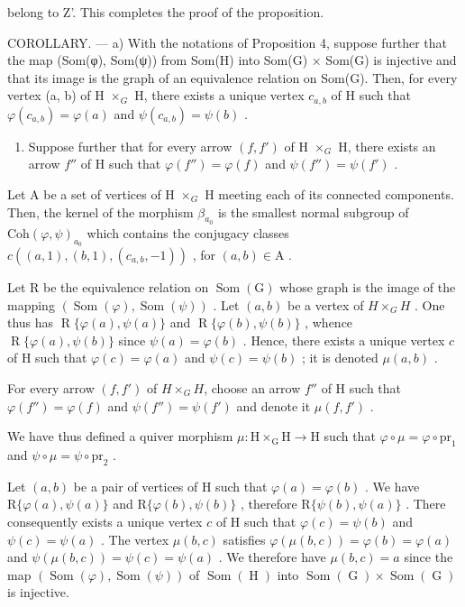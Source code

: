 belong to Z'. This completes the proof of the proposition.

COROLLARY. --- a) With the notations of Proposition 4, suppose further that the map (Som(φ), Som(ψ)) from Som(H) into Som(G) × Som(G) is injective and that its image is the graph of an equivalence relation on Som(G). Then, for every vertex (a, b) of H \(\times_{G}\) H, there exists a unique vertex \(c_{a,b}\) of H such that \(\varphi(c_{a,b}) = \varphi(a)\) and \(\psi(c_{a,b}) = \psi(b)\) .

\begin{enumerate}
\def\labelenumi{\alph{enumi})}
\setcounter{enumi}{1}
\tightlist
\item
  Suppose further that for every arrow \((f, f')\) of H \(\times_{G}\) H, there exists an arrow \(f''\) of H such that \(\varphi(f'') = \varphi(f)\) and \(\psi(f'') = \psi(f')\) .
\end{enumerate}

Let A be a set of vertices of H \(\times_{G}\) H meeting each of its connected components. Then, the kernel of the morphism \(\beta_{a_{0}}\) is the smallest normal subgroup of \(\mathrm{Coh}(\varphi,\psi)_{a_{0}}\) which contains the conjugacy classes \(c((a,1),(b,1),(c_{a,b},-1))\) , for \((a,b)\in\mathrm{A}\) .

Let R be the equivalence relation on \(\operatorname{Som}(\mathrm{G})\) whose graph is the image of the mapping \((\operatorname{Som}(\varphi),\operatorname{Som}(\psi))\) . Let \((a,b)\) be a vertex of \(H\times_{G}H\) . One thus has \(\operatorname{R}\{\varphi(a),\psi(a)\}\) and \(\operatorname{R}\{\varphi(b),\psi(b)\}\) , whence \(\operatorname{R}\{\varphi(a),\psi(b)\}\) since \(\psi(a)=\varphi(b)\) . Hence, there exists a unique vertex \(c\) of H such that \(\varphi(c)=\varphi(a)\) and \(\psi(c)=\psi(b)\) ; it is denoted \(\mu(a,b)\) .

For every arrow \((f, f')\) of \(H\times_{G}H\), choose an arrow \(f''\) of H such that \(\varphi(f'') = \varphi(f)\) and \(\psi(f'') = \psi(f')\) and denote it \(\mu(f, f')\) .

We have thus defined a quiver morphism \(\mu\colon\mathrm{H}\times_{\mathrm{G}}\mathrm{H}\to\mathrm{H}\) such that \(\varphi\circ\mu=\varphi\circ\mathrm{pr}_{1}\) and \(\psi\circ\mu=\psi\circ\mathrm{pr}_{2}\) .

Let \((a,b)\) be a pair of vertices of H such that \(\varphi(a)=\varphi(b)\) . We have \(\mathrm{R}\{\varphi(a),\psi(a)\}\) and \(\mathrm{R}\{\varphi(b),\psi(b)\}\) , therefore \(\mathrm{R}\{\psi(b),\psi(a)\}\) . There consequently exists a unique vertex \(c\) of H such that \(\varphi(c)=\psi(b)\) and \(\psi(c)=\psi(a)\) . The vertex \(\mu(b,c)\) satisfies \(\varphi(\mu(b,c))=\varphi(b)=\varphi(a)\) and \(\psi(\mu(b,c))=\psi(c)=\psi(a)\) . We therefore have \(\mu(b,c)=a\) since the map \((\operatorname{Som}(\varphi),\operatorname{Som}(\psi))\) of \(\operatorname{Som}(\operatorname{H})\) into \(\operatorname{Som}(\operatorname{G})\times\operatorname{Som}(\operatorname{G})\) is injective.

